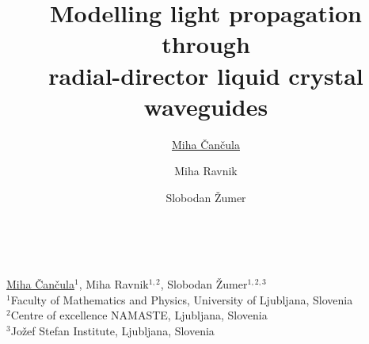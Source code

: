 \documentclass[8pt]{beamer}
\title{Modelling light propagation through\\radial-director liquid crystal waveguides}
\author{\underline{Miha \v Can\v cula\inst{1}}\and Miha Ravnik\inst{1,2}\and Slobodan \v Zumer\inst{1,2,3}}
\institute{\inst{1}Faculty of Mathematics and Physics, University of Ljubljana, Slovenia\and\inst{2}Centre of excellence NAMASTE, Ljubljana, Slovenia\and\inst{3}Jo\v zef Stefan Institute, Ljubljana, Slovenia}
\begin{document}
\begin{columns}
 \begin{column}{.976\textwidth}
  \begin{block}{}
\vspace{0.5cm}
\centering
{\fontsize{80}{96}\selectfont \inserttitle} \\
\vspace{1cm}
{\LARGE \underline{Miha \v Can\v cula$^{1}$}, Miha Ravnik$^{1,2}$, Slobodan \v Zumer$^{1,2,3}$} \\
\vspace{1cm}
{\large
$^{1}$Faculty of Mathematics and Physics, University of Ljubljana, Slovenia\\
$^{2}$Centre of excellence NAMASTE, Ljubljana, Slovenia \\
$^{3}$Jo\v zef Stefan Institute, Ljubljana, Slovenia
}
\vspace{0.5cm}
\end{block}


 \end{column}
\end{columns}
\end{document}

